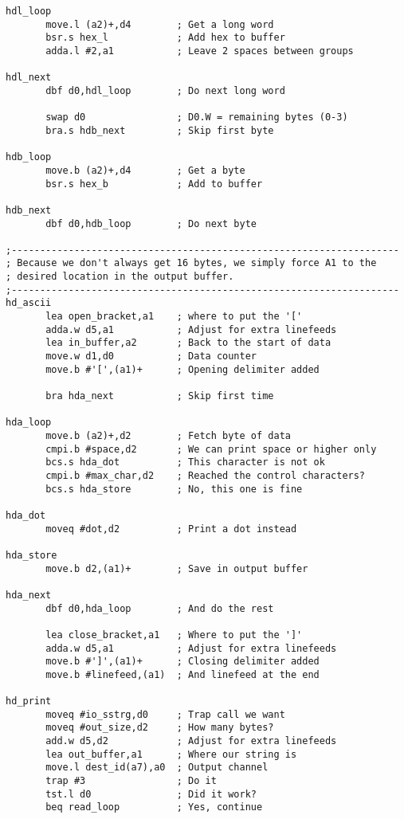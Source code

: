 \begin{lstlisting}[firstnumber=1,caption={Hexdump Utility}]
hdl_loop
       move.l (a2)+,d4        ; Get a long word
       bsr.s hex_l            ; Add hex to buffer
       adda.l #2,a1           ; Leave 2 spaces between groups

hdl_next
       dbf d0,hdl_loop        ; Do next long word            

       swap d0                ; D0.W = remaining bytes (0-3)
       bra.s hdb_next         ; Skip first byte

hdb_loop
       move.b (a2)+,d4        ; Get a byte
       bsr.s hex_b            ; Add to buffer

hdb_next
       dbf d0,hdb_loop        ; Do next byte

;--------------------------------------------------------------------
; Because we don't always get 16 bytes, we simply force A1 to the
; desired location in the output buffer.
;--------------------------------------------------------------------
hd_ascii
       lea open_bracket,a1    ; where to put the '['
       adda.w d5,a1           ; Adjust for extra linefeeds
       lea in_buffer,a2       ; Back to the start of data
       move.w d1,d0           ; Data counter   
       move.b #'[',(a1)+      ; Opening delimiter added

       bra hda_next           ; Skip first time

hda_loop
       move.b (a2)+,d2        ; Fetch byte of data
       cmpi.b #space,d2       ; We can print space or higher only
       bcs.s hda_dot          ; This character is not ok
       cmpi.b #max_char,d2    ; Reached the control characters?
       bcs.s hda_store        ; No, this one is fine

hda_dot
       moveq #dot,d2          ; Print a dot instead

hda_store
       move.b d2,(a1)+        ; Save in output buffer

hda_next
       dbf d0,hda_loop        ; And do the rest

       lea close_bracket,a1   ; Where to put the ']'
       adda.w d5,a1           ; Adjust for extra linefeeds
       move.b #']',(a1)+      ; Closing delimiter added
       move.b #linefeed,(a1)  ; And linefeed at the end

hd_print
       moveq #io_sstrg,d0     ; Trap call we want
       moveq #out_size,d2     ; How many bytes?
       add.w d5,d2            ; Adjust for extra linefeeds
       lea out_buffer,a1      ; Where our string is
       move.l dest_id(a7),a0  ; Output channel
       trap #3                ; Do it
       tst.l d0               ; Did it work?
       beq read_loop          ; Yes, continue


\end{lstlisting}

